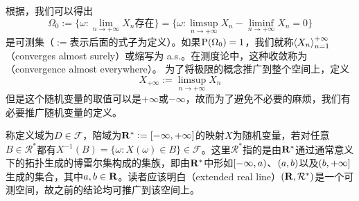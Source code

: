\documentclass[../main.tex]{subfiles}
\begin{document}
根据，我们可以得出
\[\Omega_0:=\{\omega: \lim\limits_{n\rightarrow+\infty}X_n\text{存在}\}=\{\omega:\limsup\limits_{n\rightarrow+\infty}X_n-\liminf\limits_{n\rightarrow+\infty}X_n=0\}\]
是可测集（\(:=\)表示后面的式子为定义）。如果\(\operatorname{\mathrm{P}}(\Omega_0)=1\)，我们就称\(\left<X_n\right>_{n=1}^{+\infty}\)（converges almost surely）或缩写为 a.s.。在测度论中，这种收敛称为（convergence almost everywhere）。
为了将极限的概念推广到整个空间上，定义
\[X_{+\infty}:=\limsup\limits_{n\rightarrow+\infty}X_n\]
但是这个随机变量的取值可以是\(+\infty\)或\(-\infty\)，故而为了避免不必要的麻烦，我们有必要推广随机变量的定义。

称定义域为\(D\in\mathcal{F}\)，陪域为\(\R^*:=\intcc{-\infty,+\infty}\)的映射\(X\)为随机变量，若对任意\(B\in\mathcal{R}^*\)都有\(X^{-1}(B)=\{\omega: X(\omega)\in B\}\in\mathcal{F}\)。这里\(\mathcal{R}^*\)指的是由\(\mathbf{R}^*\)通过通常意义下的拓扑生成的博雷尔集构成的集族，即由\(\mathbf{R}^*\)中形如\(\intco{-\infty,a}\)、\(\intoo{a,b}\)以及\(\intoc{b,+\infty}\)生成的集合，其中\(a,b\in\mathbf{R}\)。读者应该明白（extended real line）\((\mathbf{R},\mathcal{R}^*)\)是一个可测空间，故之前的结论均可推广到该空间上。
\end{document}
